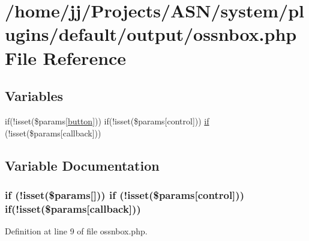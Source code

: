 \hypertarget{ossnbox_8php}{}\section{/home/jj/\+Projects/\+A\+S\+N/system/plugins/default/output/ossnbox.php File Reference}
\label{ossnbox_8php}
\subsection*{Variables}
\begin{DoxyCompactItemize}
\item 
if(!isset(\$params\mbox{[}\textquotesingle{}\hyperlink{bootstrap_8min_8js_a55e170814e74f6c3db8ae9ea3ba9054f}{button}\textquotesingle{}\mbox{]})) if(!isset(\$params\mbox{[}\textquotesingle{}control\textquotesingle{}\mbox{]})) \hyperlink{ossnbox_8php_a3dff3fa9a94cc3180c1bb99d781646ad}{if} (!isset(\$params\mbox{[}\textquotesingle{}callback\textquotesingle{}\mbox{]}))
\end{DoxyCompactItemize}


\subsection{Variable Documentation}
\subsubsection[{\texorpdfstring{if}{if}}]{\setlength{\rightskip}{0pt plus 5cm}if (!isset(\$params\mbox{[}\textquotesingle{}\mbox{]})) if (!isset(\$params\mbox{[}\textquotesingle{}control\textquotesingle{}\mbox{]})) if(!isset(\$params\mbox{[}\textquotesingle{}callback\textquotesingle{}\mbox{]}))}\hypertarget{ossnbox_8php_a3dff3fa9a94cc3180c1bb99d781646ad}{}\label{ossnbox_8php_a3dff3fa9a94cc3180c1bb99d781646ad}


Definition at line 9 of file ossnbox.\+php.

